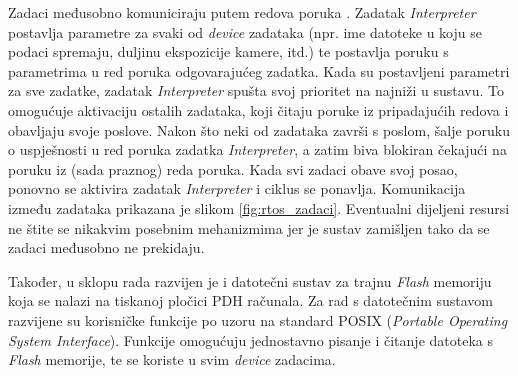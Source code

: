 Zadaci međusobno komuniciraju putem redova poruka . Zadatak \textit{Interpreter} postavlja parametre za svaki od \textit{device} zadataka (npr. ime datoteke u koju se podaci spremaju, duljinu ekspozicije kamere, itd.) te postavlja poruku s parametrima u red poruka odgovarajućeg zadatka. Kada su postavljeni parametri za sve zadatke, zadatak \textit{Interpreter} spušta svoj prioritet na najniži u sustavu. To omogućuje aktivaciju ostalih zadataka, koji čitaju poruke iz pripadajućih redova i obavljaju svoje poslove. Nakon što neki od zadataka završi s poslom, šalje poruku o uspješnosti u red poruka zadatka \textit{Interpreter}, a zatim biva blokiran čekajući na poruku iz (sada praznog) reda poruka. Kada svi zadaci obave svoj posao, ponovno se aktivira zadatak \textit{Interpreter} i ciklus se ponavlja. Komunikacija između zadataka prikazana je slikom \ref{fig:rtos_zadaci}. Eventualni dijeljeni resursi ne štite se nikakvim posebnim mehanizmima jer je sustav zamišljen tako da se zadaci međusobno ne prekidaju.

Također, u sklopu rada \cite{diplomski_goran_petrak} razvijen je i datotečni sustav za trajnu \textit{Flash} memoriju koja se nalazi na tiskanoj pločici PDH računala. Za rad s datotečnim sustavom razvijene su korisničke funkcije po uzoru na standard POSIX (\textit{Portable Operating System Interface}). Funkcije omogućuju jednostavno pisanje i čitanje datoteka s \textit{Flash} memorije, te se koriste u svim \textit{device} zadacima.